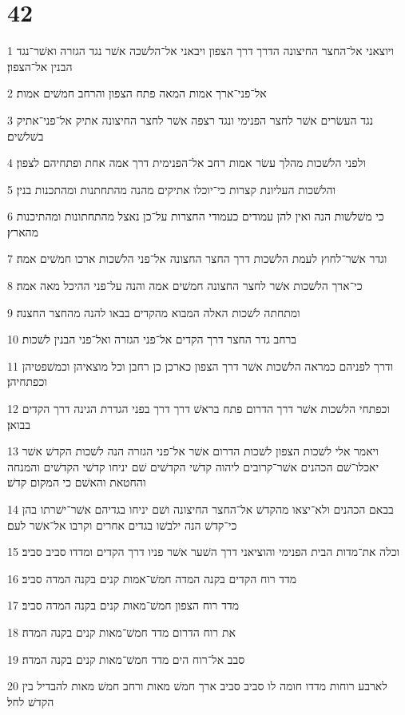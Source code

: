 \chapter{42}

\par 1 ויוצאני אל־החצר החיצונה הדרך דרך הצפון ויבאני אל־הלשׁכה אשׁר נגד הגזרה ואשׁר־נגד הבנין אל־הצפון׃
\par 2 אל־פני־ארך אמות המאה פתח הצפון והרחב חמשׁים אמות׃
\par 3 נגד העשׂרים אשׁר לחצר הפנימי ונגד רצפה אשׁר לחצר החיצונה אתיק אל־פני־אתיק בשׁלשׁים׃
\par 4 ולפני הלשׁכות מהלך עשׂר אמות רחב אל־הפנימית דרך אמה אחת ופתחיהם לצפון׃
\par 5 והלשׁכות העליונת קצרות כי־יוכלו אתיקים מהנה מהתחתנות ומהתכנות בנין׃
\par 6 כי משׁלשׁות הנה ואין להן עמודים כעמודי החצרות על־כן נאצל מהתחתונות ומהתיכנות מהארץ׃
\par 7 וגדר אשׁר־לחוץ לעמת הלשׁכות דרך החצר החצונה אל־פני הלשׁכות ארכו חמשׁים אמה׃
\par 8 כי־ארך הלשׁכות אשׁר לחצר החצונה חמשׁים אמה והנה על־פני ההיכל מאה אמה׃
\par 9 ומתחתה לשׁכות האלה המבוא מהקדים בבאו להנה מהחצר החצנה׃
\par 10 ברחב גדר החצר דרך הקדים אל־פני הגזרה ואל־פני הבנין לשׁכות׃
\par 11 ודרך לפניהם כמראה הלשׁכות אשׁר דרך הצפון כארכן כן רחבן וכל מוצאיהן וכמשׁפטיהן וכפתחיהן׃
\par 12 וכפתחי הלשׁכות אשׁר דרך הדרום פתח בראשׁ דרך דרך בפני הגדרת הגינה דרך הקדים בבואן׃
\par 13 ויאמר אלי לשׁכות הצפון לשׁכות הדרום אשׁר אל־פני הגזרה הנה לשׁכות הקדשׁ אשׁר יאכלו־שׁם הכהנים אשׁר־קרובים ליהוה קדשׁי הקדשׁים שׁם יניחו קדשׁי הקדשׁים והמנחה והחטאת והאשׁם כי המקום קדשׁ׃
\par 14 בבאם הכהנים ולא־יצאו מהקדשׁ אל־החצר החיצונה ושׁם יניחו בגדיהם אשׁר־ישׁרתו בהן כי־קדשׁ הנה ילבשׁו בגדים אחרים וקרבו אל־אשׁר לעם׃
\par 15 וכלה את־מדות הבית הפנימי והוציאני דרך השׁער אשׁר פניו דרך הקדים ומדדו סביב סביב׃
\par 16 מדד רוח הקדים בקנה המדה חמשׁ־אמות קנים בקנה המדה סביב׃
\par 17 מדד רוח הצפון חמשׁ־מאות קנים בקנה המדה סביב׃
\par 18 את רוח הדרום מדד חמשׁ־מאות קנים בקנה המדה׃
\par 19 סבב אל־רוח הים מדד חמשׁ־מאות קנים בקנה המדה׃
\par 20 לארבע רוחות מדדו חומה לו סביב סביב ארך חמשׁ מאות ורחב חמשׁ מאות להבדיל בין הקדשׁ לחל׃

